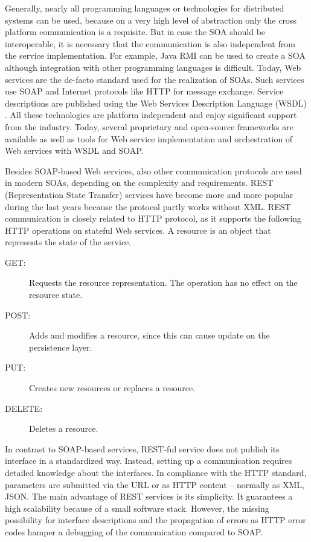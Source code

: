 Generally, nearly all programming languages or technologies for distributed systems can be used, because on a very high level of abstraction only the cross platform communication is a requisite. But in case the SOA should be interoperable, it is necessary that the communication is also independent from the service implementation. For example, Java RMI can be used to create a SOA although integration with other programming languages is difficult. Today, Web services are the de-facto standard used for the realization of SOAs. Such services use SOAP \cite{soap} and Internet protocols like HTTP for message exchange. Service descriptions are published using the Web Services Description Language (WSDL)  \cite{wsdlspec}. All these technologies are platform independent and enjoy significant support from the industry. Today, several proprietary and open-source frameworks are available as well as tools for Web service implementation and orchestration of Web services with WSDL and SOAP.

Besides SOAP-based Web services, also other communication protocols are used in modern SOAs, depending on the complexity and requirements. REST (Representation State Transfer) \cite{rest} services have become more and more popular during the last years because the protocol partly works without XML. REST communication is closely related to HTTP protocol, as it supports the following HTTP operations on stateful Web services. A resource is an object that represents the state of the service.

\begin{description}
\item[GET:] Requests the resource representation. The operation has no effect on the resource state.

\item[POST:] Adds and modifies a resource, since this can cause update on the persistence layer.

\item[PUT:] Creates new resources or replaces a resource.

\item[DELETE:] Deletes a resource.
\end{description}

In contrast to SOAP-based services, REST-ful service does not publish its interface in a standardized way. Instead, setting up a communication requires detailed knowledge about the interfaces. In compliance with the HTTP standard, parameters are submitted via the URL or as HTTP content -- normally as XML, JSON. The main advantage of REST services is its simplicity. It guarantees a high scalability because of a small software stack. However, the missing possibility for interface descriptions and the propagation of errors as HTTP error codes hamper a debugging of the communication compared to SOAP.

